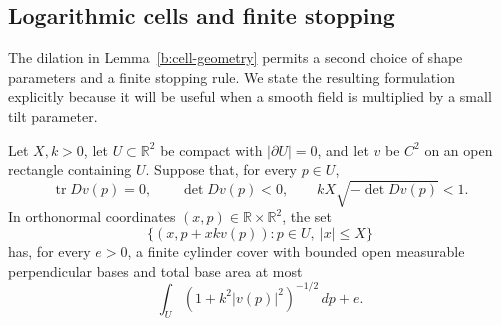 \subsection{Logarithmic cells and finite stopping}
\label{b:logarithmic-section}

The dilation in Lemma~\ref{b:cell-geometry} permits a second choice of
shape parameters and a finite stopping rule.  We state the resulting
formulation explicitly because it will be useful when a smooth field
is multiplied by a small tilt parameter.

\begin{corollary}
\label{b:logarithmic}
Let $X,k>0$, let $U\subset\mathbb R^2$ be compact with
$|\partial U|=0$, and let $v$ be $C^2$ on an open rectangle containing
$U$.  Suppose that, for every $p\in U$,
\[
 \operatorname{tr}Dv(p)=0,\qquad \det Dv(p)<0,\qquad
 kX\sqrt{-\det Dv(p)}<1.
\]
In orthonormal coordinates $(x,p)\in\mathbb R\times\mathbb R^2$,
the set
\[
 \{(x,p+xkv(p)):p\in U,\ |x|\le X\}
\]
has, for every $e>0$, a finite cylinder cover with bounded open
measurable perpendicular bases and total base area at most
\[
 \int_U(1+k^2|v(p)|^2)^{-1/2}\,dp+e.
\]
\end{corollary}

